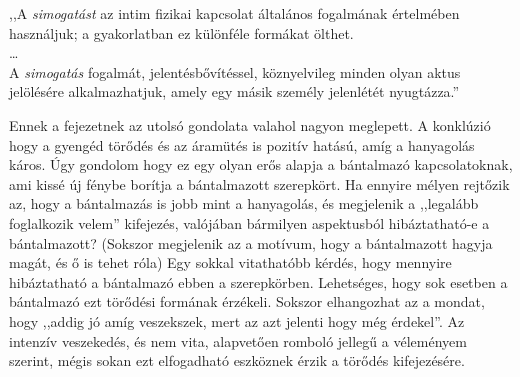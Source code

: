 \documentclass[a4paper,12pt]{article}
\begin{document}
	\begin{flushright}
		,,A \textit{simogatást} az intim fizikai kapcsolat általános fogalmának értelmében használjuk; a gyakorlatban ez különféle formákat  ölthet.\\ \dots \\ 
		A \textit{simogatás}  fogalmát, jelentésbővítéssel, köznyelvileg minden olyan aktus jelölésére alkalmazhatjuk, amely egy másik személy jelenlétét nyugtázza.''
	\end{flushright}

	Ennek a fejezetnek az utolsó gondolata valahol nagyon meglepett. A konklúzió hogy a gyengéd törődés és az áramütés is pozitív hatású, amíg a hanyagolás káros.
	Úgy gondolom hogy ez egy olyan erős alapja a bántalmazó kapcsolatoknak, ami kissé új fénybe borítja a bántalmazott szerepkört. Ha ennyire mélyen rejtőzik az, hogy a bántalmazás is jobb mint a hanyagolás, és megjelenik a ,,legalább foglalkozik velem'' kifejezés, valójában bármilyen aspektusból hibáztatható-e a bántalmazott? (Sokszor megjelenik az a motívum, hogy a bántalmazott hagyja magát, és ő is tehet róla) Egy sokkal vitathatóbb kérdés, hogy mennyire hibáztatható a bántalmazó ebben a szerepkörben. Lehetséges, hogy sok esetben a bántalmazó ezt törődési formának érzékeli. Sokszor elhangozhat az a mondat, hogy ,,addig jó amíg veszekszek, mert az azt jelenti hogy még érdekel''. Az intenzív veszekedés, és nem vita, alapvetően romboló jellegű a véleményem szerint, mégis sokan ezt elfogadható eszköznek érzik a törődés kifejezésére. 
	
\end{document}
